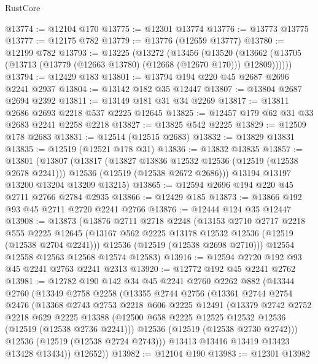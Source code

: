 \begin{lexlean}{RustCore}
\begin{coremodule}
@13774 := @12104 @170
@13775 := @12301 @13774
@13776 := @13773 @13775
@13777 := @12175 @782
@13779 := @13776 (@12659 @13777)
@13780 := @12199 @782
@13793 := @13225
    (@13272
      (@13456
        (@13520 (@13662 (@13705 (@13713 (@13779 (@12663 @13780) (@12668 (@12670 @170))) @12809))))))
@13794 := @12429 @183
@13801 := @13794 @194 @220 @45 @2687 @2696 @2241 @2937
@13804 := @13142 @182 @35 @12447
@13807 := @13804 @2687 @2694 @2392
@13811 := @13149 @181 @31 @34 @2269
@13817 := @13811 @2686 @2693 @2218 @537 @2225 @12645
@13825 := @12457 @179 @62 @31 @33 @2683 @2241 @2258 @2218
@13827 := @13825 @542 @2225
@13829 := @12509 @178 @2683
@13831 := @12514 (@12515 @2683)
@13832 := @13829 @13831
@13835 := @12519 (@12521 @178 @31)
@13836 := @13832 @13835
@13857 := @13801
    (@13807
      (@13817
        (@13827 @13836 @12532 @12536 (@12519 (@12538 @2678 @2241)))
        @12536
        (@12519 (@12538 @2672 @2686)))
      @13194
      @13197
      @13200
      @13204
      @13209
      @13215)
@13865 := @12594 @2696 @194 @220 @45 @2711 @2766 @2784 @2935
@13866 := @12429 @185
@13873 := @13866 @192 @93 @45 @2711 @2720 @2241 @2766
@13876 := @12444 @124 @35 @12447
@13908 := @13873
    (@13876
      @2711
      @2718
      @2248
      (@13153
        @2710
        @2717
        @2218
        @555
        @2225
        @12645
        (@13167 @562 @2225 @13178 @12532 @12536 (@12519 (@12538 @2704 @2241)))
        @12536
        (@12519 (@12538 @2698 @2710)))
      @12554
      @12558
      @12563
      @12568
      @12574
      @12583)
@13916 := @12594 @2720 @192 @93 @45 @2241 @2763 @2241 @2313
@13920 := @12772 @192 @45 @2241 @2762
@13981 := @12782
    @190
    @142
    @34
    @45
    @2241
    @2760
    @2262
    @882
    (@13344
      @2760
      (@13349
        @2758
        @2258
        (@13355
          @2744
          @2756
          (@13361
            @2744
            @2754
            @2476
            (@13368
              @2743
              @2753
              @2218
              @606
              @2225
              @12491
              (@13379
                @2742
                @2752
                @2218
                @629
                @2225
                @13388
                (@12500 @658 @2225 @12525 @12532 @12536 (@12519 (@12538 @2736 @2241)))
                @12536
                (@12519 (@12538 @2730 @2742)))
              @12536
              (@12519 (@12538 @2724 @2743)))
            @13413
            @13416
            @13419
            @13423
            @13428
            @13434))
        @12652))
@13982 := @12104 @190
@13983 := @12301 @13982

\end{coremodule}
\end{lexlean}
